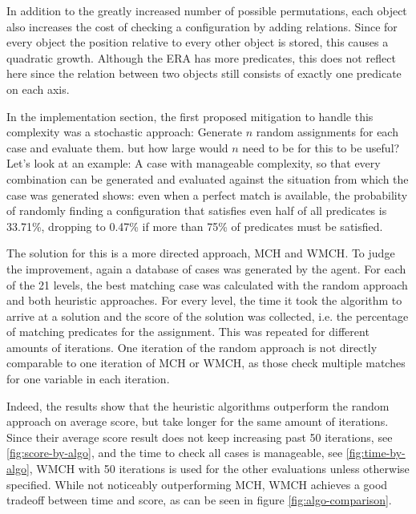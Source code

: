 In addition to the greatly increased number of possible permutations, each object also increases the cost of checking a configuration by adding relations.
Since for every object the position relative to every other object is stored, this causes a quadratic growth. Although the ERA has more predicates, this does not reflect here since the relation between two objects still consists of exactly one predicate on each axis.


In the implementation section, the first proposed mitigation to handle this complexity was a stochastic approach: Generate $n$ random assignments for each case and evaluate them. but how large would $n$ need to be for this to be useful?
Let's look at an example: A case with manageable complexity, so that every combination can be generated and evaluated against the situation from which the case was generated shows: even when a perfect match is available, the probability of randomly finding a configuration that satisfies even half of all predicates is 33.71\%, dropping to 0.47\% if more than 75\% of predicates must be satisfied.


The solution for this is a more directed approach, \ac{MCH} and \ac{WMCH}. To judge the improvement, again a database of cases was generated by the agent.
For each of the 21 levels, the best matching case was calculated with the random approach and both heuristic approaches. For every level, the time it took the algorithm to arrive at a solution and the score of the solution was collected, i.e. the percentage of matching predicates for the assignment. This was repeated for different amounts of iterations. One iteration of the random approach is not directly comparable to one iteration of \ac{MCH} or \ac{WMCH}, as those check multiple matches for one variable in each iteration.

Indeed, the results show that the heuristic algorithms outperform the random approach on average score, but take longer for the same amount of iterations. Since their average score result does not keep increasing past 50 iterations, see \ref{fig:score-by-algo}, and the time to check all cases is manageable, see \ref{fig:time-by-algo}, \ac{WMCH} with 50 iterations is used for the other evaluations unless otherwise specified.
While not noticeably outperforming \ac{MCH}, \ac{WMCH} achieves a good tradeoff between time and score, as can be seen in figure \ref{fig:algo-comparison}.

